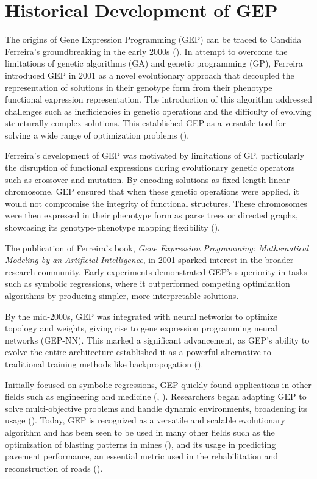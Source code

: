 \section{Historical Development of GEP}\label{sec:gep_historical_background}
The origins of Gene Expression Programming (GEP) can be traced to Candida Ferreira's groundbreaking in the early 2000s (\cite{ferreira2006gene}). In attempt to overcome the limitations of genetic algorithms (GA) and genetic programming (GP), Ferreira introduced GEP in 2001 as a novel evolutionary approach that decoupled the representation of solutions in their genotype form from their phenotype functional expression representation. The introduction of this algorithm addressed challenges such as inefficiencies in genetic operations and the difficulty of evolving structurally complex solutions. This established GEP as a versatile tool for solving a wide range of optimization problems (\cite{ferreira2006gene}). \bigskip

\noindent Ferreira's development of GEP was motivated by limitations of GP, particularly the disruption of functional expressions during evolutionary genetic operators such as crossover and mutation. By encoding solutions as fixed-length linear chromosome, GEP ensured that when these genetic operations were applied, it would not compromise the integrity of functional structures. These chromosomes were then expressed in their phenotype form as parse trees or directed graphs, showcasing its genotype-phenotype mapping flexibility (\cite{ferreira2006gene}). \bigskip

\noindent The publication of Ferreira's book, \textit{Gene Expression Programming: Mathematical Modeling by an Artificial Intelligence}, in 2001 sparked interest in the broader research community. Early experiments demonstrated GEP's superiority in tasks such as symbolic regressions, where it outperformed competing optimization algorithms by producing simpler, more interpretable solutions. \bigskip

\noindent By the mid-2000s, GEP was integrated with neural networks to optimize topology and weights, giving rise to gene expression programming neural networks (GEP-NN). This marked a significant advancement, as GEP's ability to evolve the entire architecture established it as a powerful alternative to traditional training methods like backpropogation (\cite{ferreira2006gene}). \bigskip

\noindent Initially focused on symbolic regressions, GEP quickly found applications in other fields such as engineering and medicine (\cite{malik2016application}, \cite{kusy2013application}). Researchers began adapting GEP to solve multi-objective problems and handle dynamic environments, broadening its usage (\cite{zheng2012multi}). Today, GEP is recognized as a versatile and scalable evolutionary algorithm and has been seen to be used in many other fields such as the optimization of blasting patterns in mines (\cite{bayat2022blasting}), and its usage in predicting pavement performance, an essential metric used in the rehabilitation and reconstruction of roads (\cite{mazari2016prediction}).

